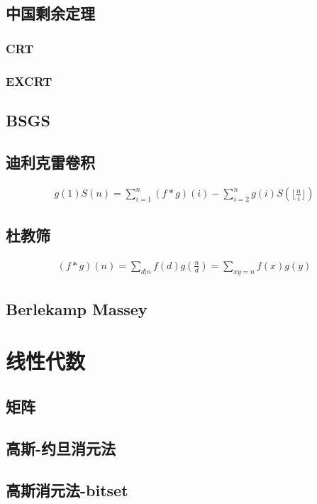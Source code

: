 \documentclass{article}
\begin{document}
\subsection{中国剩余定理}
\subsubsection{CRT}

\subsubsection{EXCRT}

\subsection{BSGS}
\subsection{迪利克雷卷积}

$$
\begin{aligned}
g(1)S(n)=\sum_{i=1}^n(f*g)(i)-\sum_{i=2}^ng(i)S(\lfloor\frac{n}{i}\rfloor)
\end{aligned}
$$

\subsection{杜教筛}

$$
\begin{aligned}
(f*g)(n)=\underset{d|n}{\sum} f(d)g(\frac{n}{d})=\underset{xy=n}{\sum} f(x)g(y)
\end{aligned}
$$

\subsection{Berlekamp Massey}


\section{线性代数}
\subsection{矩阵}
\subsection{高斯-约旦消元法}

\subsection{高斯消元法-bitset}

\end{document}

